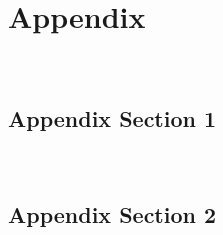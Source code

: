 \appendix
%
\chapter{Appendix}
~\label{ch:Appendix}
%
\section{Appendix Section 1}
~\label{sec:Appendix_1}
\setcounter{figure}{0}
\setcounter{table}{0}




\section{Appendix Section 2}
~\label{sec:Appendix_2}
\setcounter{figure}{0}
\setcounter{table}{0}
